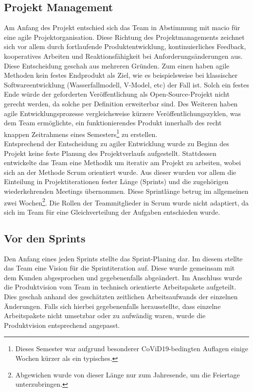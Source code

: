 \documentclass[10pt, a4paper]{article}
\begin{document}
\subsection{Projekt Management}
Am Anfang des Projekt entschied sich das Team in Abstimmung mit macio für eine agile Projektorganisation.
Diese Richtung des Projektmanagements zeichnet sich vor allem durch fortlaufende Produktentwicklung, kontinuierliches Feedback, kooperatives Arbeiten und
Reaktionsfähigkeit bei Anforderungsänderungen aus. Diese Entscheidung geschah aus mehreren Gründen.
Zum einen haben agile Methoden kein festes Endprodukt als Ziel, wie es beispielsweise bei klassischer Softwareentwicklung
(Wasserfallmodell, V-Model, etc) der Fall ist. Solch ein festes Ende würde der geforderten Veröffentlichung als Open-Source-Projekt nicht gerecht werden,
da solche per Definition erweiterbar sind. Des Weiteren haben agile Entwicklungsprozesse vergleichsweise kürzere Veröffentlichungszyklen,
was dem Team ermöglichte, ein funktionierendes Produkt innerhalb des recht knappen Zeitrahmens eines
Semesters\footnote{Dieses Semester war aufgrund besonderer CoViD19-bedingten Auflagen einige Wochen kürzer als ein typisches.} zu erstellen.
\\
Entsprechend der Entscheidung zu agiler Entwicklung wurde zu Beginn des Projekt keine feste Planung des Projektverlaufs aufgestellt.
Stattdessen entwickelte das Team eine Methodik um iterativ am Projekt zu arbeiten, wobei sich an der Methode Scrum orientiert wurde.
Aus dieser wurden vor allem die Einteilung in Projektiterationen fester Länge (Sprints) und die zugehörigen wiederkehrenden Meetings übernommen.
Diese Sprintlänge betrug im allgemeinen zwei Wochen\footnote{Abgewichen wurde von dieser Länge nur zum Jahresende, um die Feiertage unterzubringen.}.
Die Rollen der Teammitglieder in Scrum wurde nicht adaptiert, da sich im Team für eine Gleichverteilung der Aufgaben entschieden wurde.

\subsection{Vor den Sprints}
Den Anfang eines jeden Sprints stellte das Sprint-Planing dar.
Im diesem stellte das Team eine Vision für die Sprintiteration auf.
Diese wurde gemeinsam mit dem Kunden abgesprochen und gegebenenfalls abgeändert.
Im Anschluss wurde die Produktvision vom Team in technisch orientierte Arbeitspakete aufgeteilt.
Dies geschah anhand des geschätzten zeitlichen Arbeitsaufwands der einzelnen Änderungen.
Falls sich hierbei gegebenenfalls herausstellte, dass einzelne Arbeitspakete nicht umsetzbar oder zu aufwändig waren, wurde die Produktvision entsprechend angepasst.
\end{document}
